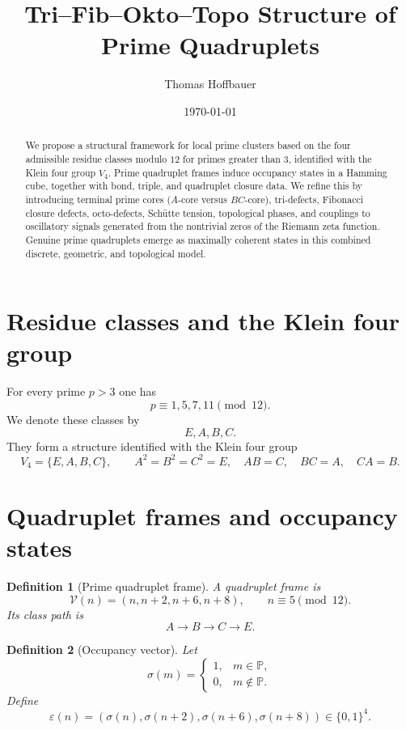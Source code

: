 \documentclass[11pt,a4paper]{article}
\title{Tri--Fib--Okto--Topo Structure of Prime Quadruplets}
\author{Thomas Hoffbauer}
\date{\today}
\newtheorem{definition}{Definition}[section]
\begin{document}
	
	\maketitle
	
	\begin{abstract}
		We propose a structural framework for local prime clusters based on the four admissible residue classes modulo $12$ for primes greater than $3$, identified with the Klein four group $V_4$. Prime quadruplet frames induce occupancy states in a Hamming cube, together with bond, triple, and quadruplet closure data. We refine this by introducing terminal prime cores ($A$-core versus $BC$-core), tri-defects, Fibonacci closure defects, octo-defects, Sch\"utte tension, topological phases, and couplings to oscillatory signals generated from the nontrivial zeros of the Riemann zeta function. Genuine prime quadruplets emerge as maximally coherent states in this combined discrete, geometric, and topological model.
	\end{abstract}
	
	\section{Residue classes and the Klein four group}
	
	For every prime $p>3$ one has
	\[
	p\equiv 1,5,7,11 \pmod{12}.
	\]
	We denote these classes by
	\[
	E,A,B,C.
	\]
	They form a structure identified with the Klein four group
	\[
	V_4=\{E,A,B,C\},
	\qquad
	A^2=B^2=C^2=E,\quad AB=C,\quad BC=A,\quad CA=B.
	\]
	
	\section{Quadruplet frames and occupancy states}
	
	\begin{definition}[Prime quadruplet frame]
		A quadruplet frame is
		\[
		\mathcal V(n)=(n,n+2,n+6,n+8),
		\qquad n\equiv 5\pmod{12}.
		\]
		Its class path is
		\[
		A\to B\to C\to E.
		\]
	\end{definition}
	
	\begin{definition}[Occupancy vector]
		Let
		\[
		\sigma(m)=
		\begin{cases}
			1,&m\in\mathbb P,\\
			0,&m\notin\mathbb P.
		\end{cases}
		\]
		Define
		\[
		\varepsilon(n)=
		(\sigma(n),\sigma(n+2),\sigma(n+6),\sigma(n+8))
		\in\{0,1\}^4.
		\]
	\end{definition}
	
\end{document}
